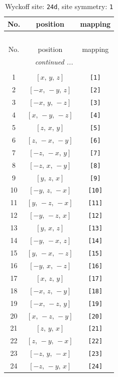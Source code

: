 \documentclass[fleqn,8pt]{jsarticle}
\begin{document}
\begin{longtable}{ccc}
\caption{Wyckoff site: {\tt 24d}, site symmetry: {\tt 1}}
 \\
 \hline \hline
No. & position & mapping \\ \hline \endfirsthead

\multicolumn{2}{l}{\tablename\ \thetable{}} \\
 \hline \hline
No. & position & mapping \\ \hline \endhead

 \hline \hline
\multicolumn{2}{r}{\footnotesize\it continued ...} \\ \endfoot

 \hline \hline
\multicolumn{2}{r}{} \\ \endlastfoot

1 & $\left[ x,\, y,\, z \right]$ & {\tt [1]} \\ \hline
2 & $\left[ - x,\, - y,\, z \right]$ & {\tt [2]} \\ \hline
3 & $\left[ - x,\, y,\, - z \right]$ & {\tt [3]} \\ \hline
4 & $\left[ x,\, - y,\, - z \right]$ & {\tt [4]} \\ \hline
5 & $\left[ z,\, x,\, y \right]$ & {\tt [5]} \\ \hline
6 & $\left[ z,\, - x,\, - y \right]$ & {\tt [6]} \\ \hline
7 & $\left[ - z,\, - x,\, y \right]$ & {\tt [7]} \\ \hline
8 & $\left[ - z,\, x,\, - y \right]$ & {\tt [8]} \\ \hline
9 & $\left[ y,\, z,\, x \right]$ & {\tt [9]} \\ \hline
10 & $\left[ - y,\, z,\, - x \right]$ & {\tt [10]} \\ \hline
11 & $\left[ y,\, - z,\, - x \right]$ & {\tt [11]} \\ \hline
12 & $\left[ - y,\, - z,\, x \right]$ & {\tt [12]} \\ \hline
13 & $\left[ y,\, x,\, z \right]$ & {\tt [13]} \\ \hline
14 & $\left[ - y,\, - x,\, z \right]$ & {\tt [14]} \\ \hline
15 & $\left[ y,\, - x,\, - z \right]$ & {\tt [15]} \\ \hline
16 & $\left[ - y,\, x,\, - z \right]$ & {\tt [16]} \\ \hline
17 & $\left[ x,\, z,\, y \right]$ & {\tt [17]} \\ \hline
18 & $\left[ - x,\, z,\, - y \right]$ & {\tt [18]} \\ \hline
19 & $\left[ - x,\, - z,\, y \right]$ & {\tt [19]} \\ \hline
20 & $\left[ x,\, - z,\, - y \right]$ & {\tt [20]} \\ \hline
21 & $\left[ z,\, y,\, x \right]$ & {\tt [21]} \\ \hline
22 & $\left[ z,\, - y,\, - x \right]$ & {\tt [22]} \\ \hline
23 & $\left[ - z,\, y,\, - x \right]$ & {\tt [23]} \\ \hline
24 & $\left[ - z,\, - y,\, x \right]$ & {\tt [24]} \\
\end{longtable}
\end{document}
